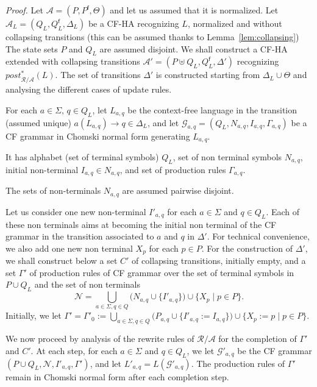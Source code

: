 \documentclass[a4paper]{article}
\theoremstyle{plain}
\newenvironment{proof}{\noindent\emph{Proof.}}{}
\newcommand{\R}{\mathcal{R}}
\newcommand{\N}{\mathcal{N}}
\newcommand{\F}{\Sigma}
\newcommand{\A}{\mathcal{A}}
\newcommand{\G}{\mathcal{G}}
\newcommand{\ptrs}[2]{{#1}{/}{#2}}
\newcommand{\final}{\mathsf{f}}
\newcommand{\post}{\mathit{post}}
\begin{document}
\medskip
\begin{proof}
Let $\A = (P, P^\final, \Theta)$ and let us assumed that it is normalized.
Let  $\A_L = (Q_L, Q_L^\final, \Delta_L)$ be a CF-HA recognizing $L$, 
normalized and without collapsing transitions
(this can be assumed thanks to Lemma~\ref{lem:collapsing})
The state sets $P$ and $Q_L$ are assumed disjoint.
We shall construct a CF-HA 
extended with collapsing transitions 
$\A' = (P \uplus Q_L, Q_L^\final, \Delta')$ 
recognizing $\post^*_{\ptrs{\R}{\A}}(L)$. 
The set of transitions $\Delta'$ is constructed starting 
from $\Delta_L \cup \Theta$
and analysing the different cases of update rules.

For each $a \in \F$, $q \in Q_L$, let $L_{a, q}$ be the context-free
language in the transition (assumed unique) $a(L_{a, q}) \to q \in \Delta_L$,
and let $\G_{a, q} = (Q_L, N_{a, q}, I_{a, q}, \Gamma_{a, q})$  be a CF grammar
in Chomski normal form generating $L_{a, q}$.
\begin{RR}
It has alphabet (set of terminal symbols) $Q_L$, 
set of non terminal symbols $N_{a, q}$, 
initial non-terminal $I_{a, q} \in N_{a, q}$, 
and set of production rules $\Gamma_{a, q}$.
\end{RR}
The sets of non-terminals $N_{a, q}$ are assumed pairwise disjoint.

Let us consider one new non-terminal $I'_{a, q}$ for each $a \in \F$ and $q \in Q_L$.
Each of these non terminals aims at becoming the initial non terminal 
of the CF grammar in the transition associated to $a$ and $q$ in $\Delta'$.
For technical convenience, we also add one new non terminal $X_p$
for each $p \in P$.
For the construction of $\Delta'$, we shall construct below 
a set $C'$ of collapsing transitions, initially empty, and
a set $\Gamma'$ of production rules of CF grammar over
the set of terminal symbols in $P \cup Q_L$ and the 
set of non terminals 
\[ \N = \displaystyle\bigcup_{a \in \F, q \in Q} \bigl( N_{a, q} \cup \{ I'_{a, q} \}\bigr)
 \cup \{ X_p \mid p \in P \}. \]
Initially, we let 
$\Gamma' = \Gamma'_0 := \displaystyle\bigcup_{a \in \F, q \in Q} 
  \bigl(P_{a, q} \cup \{ I'_{a,q} := I_{a,q} \}\bigr) 
  \cup \{ X_p := p \mid p \in P \}$.


We now proceed by analysis of the rewrite rules of $ \ptrs{\R}{\A}$
for the completion of $\Gamma'$ and $C'$.
At each step,
for each $a \in \F$ and $q \in Q_L$, 
we let $\G'_{a, q}$ be the CF grammar $(P \cup Q_L, \N, I'_{a, q}, \Gamma')$,
and let $L'_{a, q} = L(\G'_{a, q})$.
The production rules of $\Gamma'$ remain in Chomski normal form
after each completion step.


\end{proof}
\end{document}
